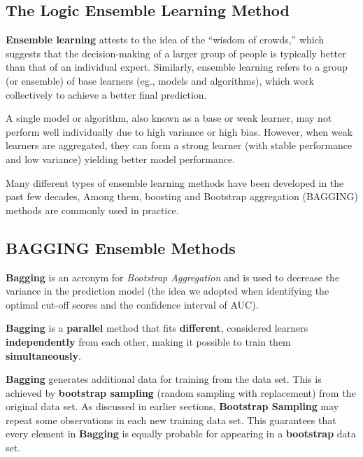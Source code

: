 \documentclass[
]{book}
\begin{document}
\hypertarget{the-logic-ensemble-learning-method}{%
\subsection{The Logic Ensemble Learning Method}\label{the-logic-ensemble-learning-method}}

\textbf{Ensemble learning} attests to the idea of the ``wisdom of crowds,'' which suggests that the decision-making of a larger group of people is typically better than that of an individual expert. Similarly, ensemble learning refers to a group (or ensemble) of base learners (eg., models and algorithms), which work collectively to achieve a better final prediction.

A single model or algorithm, also known as a base or weak learner, may not perform well individually due to high variance or high bias. However, when weak learners are aggregated, they can form a strong learner (with stable performance and low variance) yielding better model performance.

Many different types of ensemble learning methods have been developed in the past few decades, Among them, boosting and Bootstrap aggregation (BAGGING) methods are commonly used in practice.

\hfill\break

\hypertarget{bagging-ensemble-methods}{%
\subsection{BAGGING Ensemble Methods}\label{bagging-ensemble-methods}}

\textbf{Bagging} is an acronym for \emph{Bootstrap Aggregation} and is used to decrease the variance in the prediction model (the idea we adopted when identifying the optimal cut-off scores and the confidence interval of AUC).

\textbf{Bagging} is a \textbf{\color{blue}parallel} method that fits \textbf{\color{blue}different}, considered learners \textbf{\color{blue}independently} from each other, making it possible to train them \textbf{\color{red}simultaneously}.

\textbf{Bagging} generates additional data for training from the data set. This is achieved by \textbf{\color{red}bootstrap sampling} (random sampling with replacement) from the original data set. As discussed in earlier sections, \textbf{Bootstrap Sampling} may repeat some observations in each new training data set. This guarantees that every element in \textbf{Bagging} is equally probable for appearing in a \textbf{bootstrap} data set.
\end{document}
